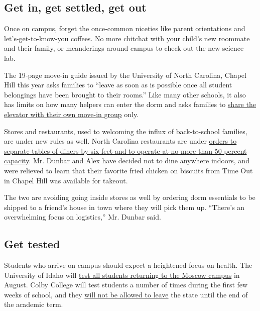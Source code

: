 \hypertarget{get-in-get-settled-get-out}{%
\subsection{Get in, get settled, get
out}\label{get-in-get-settled-get-out}}

Once on campus, forget the once-common niceties like parent orientations
and let's-get-to-know-you coffees. No more chitchat with your child's
new roommate and their family, or meanderings around campus to check out
the new science lab.

The 19-page move-in guide issued by the University of North Carolina,
Chapel Hill this year asks families to ``leave as soon as is possible
once all student belongings have been brought to their rooms.'' Like
many other schools, it also has limits on how many helpers can enter the
dorm and asks families to
\href{https://housing.unc.edu/sites/housing.unc.edu/files/Move-In\%20Guide\%2020-21.pdf}{share
the elevator with their own move-in group} only.

Stores and restaurants, used to welcoming the influx of back-to-school
families, are under new rules as well. North Carolina restaurants are
under
\href{https://files.nc.gov/covid/documents/guidance/NCDHHS-Interim-Guidance-for-Restaurants-Phase-2.pdf}{orders
to separate tables of diners by six feet and to operate at no more than
50 percent capacity}. Mr. Dunbar and Alex have decided not to dine
anywhere indoors, and were relieved to learn that their favorite fried
chicken on biscuits from Time Out in Chapel Hill was available for
takeout.

The two are avoiding going inside stores as well by ordering dorm
essentials to be shipped to a friend's house in town where they will
pick them up. ``There's an overwhelming focus on logistics,'' Mr. Dunbar
said.

\hypertarget{get-tested}{%
\subsection{Get tested}\label{get-tested}}

Students who arrive on campus should expect a heightened focus on
health. The University of Idaho will
\href{https://www.uidaho.edu/-/media/UIdaho-Responsive/Files/health-clinic/covid-19/memos/memo-200716-green.pdf}{test
all students returning to the Moscow campus} in August. Colby College
will test students a number of times during the first few weeks of
school, and they
\href{https://covid19.colby.edu/fall-2020-planning/}{will not be allowed
to leave} the state until the end of the academic term.

